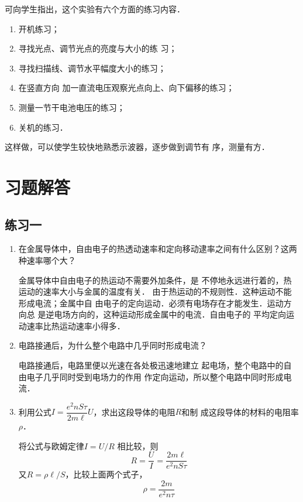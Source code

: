 可向学生指出，这个实验有六个方面的练习内容．
\begin{enumerate}
    \item 开机练习； \item 寻找光点、调节光点的亮度与大小的练
    习； \item 寻找扫描线、调节水平幅度大小的练习； \item 在竖直方向
    加一直流电压观察光点向上、向下偏移的练习； \item 测量一节干电池电压的练习；\item 关机的练习．
\end{enumerate}


这样做，可以使学生较快地熟悉示波器，逐步做到调节有
序，测量有方．

\section{习题解答}

\subsection{练习一}
\begin{enumerate}
    \item 在金属导体中，自由电子的热透动速率和定向移动逮率之间有什么区别？这两种速率哪个大？

    \begin{solution}
        金属导体中自由电子的热运动不需要外加条件，是
        不停地永远进行着的，热运动的速率大小与金属的温度有关．
        由于热运动的不规则性．这种运动不能形成电流；金属中自
        由电子的定向运动．必须有电场存在才能发生．运动方向总
        是逆电场方向的，这种运动形成金属中的电流．自由电子的
        平均定向运动速率比热运动速率小得多．
    \end{solution}
    
    \item 电路接通后，为什么整个电路中几乎同时形成电流？

    \begin{solution}
        电路接通后，电路里便以光速在各处极迅速地建立
        起电场，整个电路中的自由电子几乎同时受到电场力的作用
        作定向运动，所以整个电路中同时形成电流．
    \end{solution}
    
    \item 利用公式$I=\dfrac{e^2 nS\tau}{2m\ell}U$，求出这段导体的电阻$R$和制
成这段导体的材料的电阻率$\rho$．

\begin{solution}
    将公式与欧姆定律$I=U/R$
    相比较，则
    \[R=\frac{U}{I}=\frac{2m\ell}{e^2 nS\tau}\]
又$R=\rho\ell/S$，比较上面两个式子，
\[\rho=\frac{2m}{e^2 n\tau}\]
\end{solution}

\end{enumerate}

